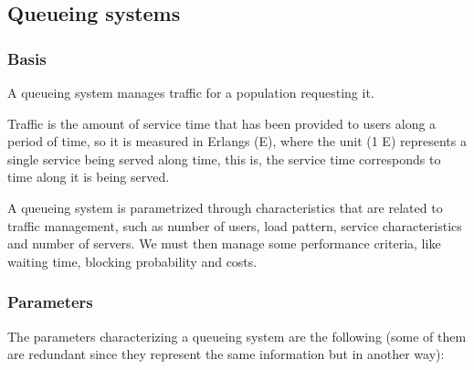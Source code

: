 \documentclass[
	12pt,
	twoside
]{book}
\begin{document}
\subsection{Queueing systems}

\subsubsection{Basis}

A queueing system manages traffic for a population requesting it.

Traffic is the amount of service time that has been provided to users along a period of time, so it is measured in Erlangs (E), where the unit (1 E) represents a single service being served along time, this is, the service time corresponds to time along it is being served.

A queueing system is parametrized through characteristics that are related to traffic management, such as number of users, load pattern, service characteristics and number of servers. We must then manage some performance criteria, like waiting time, blocking probability and costs.

\subsubsection{Parameters}

The parameters characterizing a queueing system are the following (some of them are redundant since they represent the same information but in another way):
\end{document}
